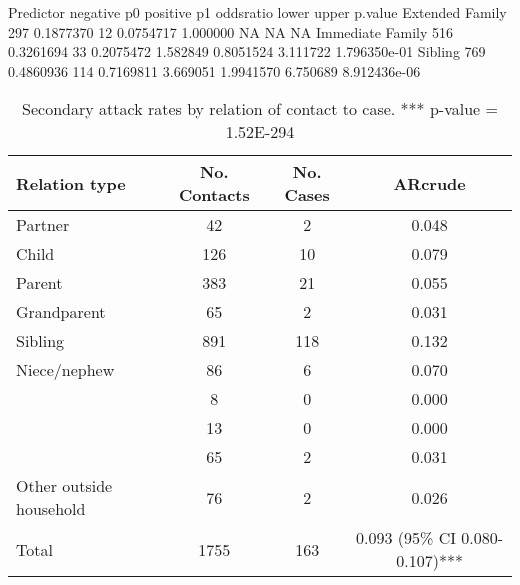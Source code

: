 Predictor          negative        p0 positive        p1 oddsratio     lower    upper      p.value
  Extended Family       297 0.1877370       12 0.0754717  1.000000        NA       NA           NA
  Immediate Family      516 0.3261694       33 0.2075472  1.582849 0.8051524 3.111722 1.796350e-01
  Sibling               769 0.4860936      114 0.7169811  3.669051 1.9941570 6.750689 8.912436e-06
  
\begin{table}[!hb]
    \caption{Secondary attack rates by relation of contact to case. *** p-value = 1.52E-294}
    \begin{tabular}{@{}lccc@{}}
    \toprule
    Relation type & No. Contacts & No. Cases & ARcrude \\
    \cmidrule
    Partner & 42 & 2 & 0.048 \\ 
    Child & 126 & 10 & 0.079 \\                  
    Parent & 383 & 21 & 0.055 \\
    Grandparent & 65       & 2     & 0.031 \\
    Sibling & 891      & 118   & 0.132 \\
    Niece/nephew & 86       & 6     & 0.070 \\
    ~   & 8        & 0     & 0.000 \\
    ~   & 13       & 0     & 0.000  \\
    ~   & 65       & 2     & 0.031  \\
    Other outside household & 76 & 2 & 0.026 \\
    Total & 1755 & 163 & 0.093 (95\% CI 0.080-0.107)*** \\
    \bottomrule
    \end{tabular}
    \label{table2}
\end{table}

